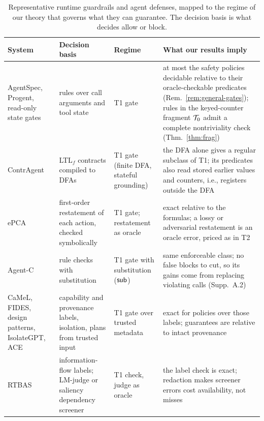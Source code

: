 \begin{table}[t]
\caption{Representative runtime guardrails and agent defenses, mapped to the regime of our
theory that governs what they can guarantee. The decision basis is what decides allow or block.}
\label{tab:systems-ext}
\centering\footnotesize
\setlength{\tabcolsep}{4pt}
\renewcommand{\arraystretch}{1.1}
\begin{tabularx}{\textwidth}{@{}>{\raggedright\arraybackslash}p{}>{\raggedright\arraybackslash}p{}>{\raggedright\arraybackslash}p{}>{\raggedright\arraybackslash}X@{}}
\toprule
System & Decision basis & Regime & What our results imply \\
\midrule
AgentSpec, Progent, read-only state gates \citep{agentspec2026,progent2025,reddy2026reasonless}
  & rules over call arguments and tool state & T1 gate
  & at most the safety policies decidable relative to their oracle-checkable predicates (Rem.~\ref{rem:general-gates}); rules in the keyed-counter fragment $\mathcal{T}_0$ admit a complete nontriviality check (Thm.~\ref{thm:frag}) \\
\addlinespace[2pt]
ContrAgent \citep{xiao2026contragent}
  & LTL$_f$ contracts compiled to DFAs & T1 gate (finite DFA, stateful grounding)
  & the DFA alone gives a regular subclass of T1; its predicates also read stored earlier values and counters, i.e., registers outside the DFA \\
\addlinespace[2pt]
ePCA \citep{wu2026provably}
  & first-order restatement of each action, checked symbolically & T1 gate; restatement as oracle
  & exact relative to the formulas; a lossy or adversarial restatement is an oracle error, priced as in T2 \\
\addlinespace[2pt]
Agent-C \citep{agentc2025}
  & rule checks with substitution & T1 gate with substitution ($\mathsf{sub}$)
  & same enforceable class; no false blocks to cut, so its gains come from replacing violating calls (Supp.~A.2) \\
\addlinespace[2pt]
CaMeL, FIDES, design patterns, IsolateGPT, ACE \citep{debenedetti2025camel,costa2025fides,beurerkellner2025design,wu2025isolategpt,li2026ace}
  & capability and provenance labels, isolation, plans from trusted input & T1 gate over trusted metadata
  & exact for policies over those labels; guarantees are relative to intact provenance \\
\addlinespace[2pt]
RTBAS \citep{zhong2025rtbas}
  & information-flow labels; LM-judge or saliency dependency screener & T1 check, judge as oracle
  & the label check is exact; redaction makes screener errors cost availability, not misses \\

\end{tabularx}
\end{table}
